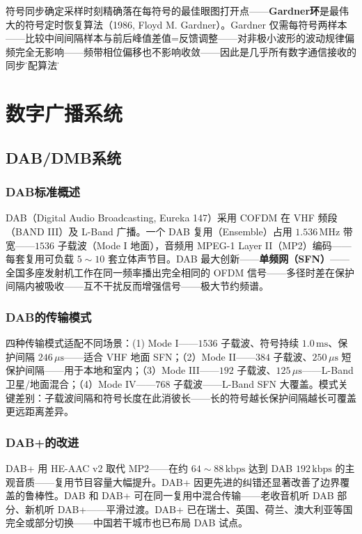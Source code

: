 \documentclass[12pt,UTF8]{ctexbook}
\begin{document}
符号同步确定采样时刻精确落在每符号的最佳眼图打开点——\textbf{Gardner环}是最伟大的符号定时恢复算法（1986, Floyd M. Gardner）。Gardner 仅需每符号两样本——比较中间间隔样本与前后峰值差值=反馈调整——对非极小波形的波动规律偏频完全无影响——频带相位偏移也不影响收敛——因此是几乎所有数字通信接收的同步\"标配算法\"。


\chapter{数字广播系统}
\label{chap:digital_broadcast_systems}

\section{DAB/DMB系统}
\label{sec:dab_system}

\subsection{DAB标准概述}

DAB（Digital Audio Broadcasting, Eureka 147）采用 COFDM 在 VHF 频段（BAND III）及 L-Band 广播。一个 DAB 复用（Ensemble）占用 $1.536\,\mathrm{MHz}$ 带宽——$1536$ 子载波（Mode I 地面），音频用 MPEG-1 Layer II（MP2）编码——每套复用可负载 $5\sim10$ 套立体声节目。DAB 最大创新——\textbf{单频网（SFN）}——全国多座发射机工作在同一频率播出完全相同的 OFDM 信号——多径时差在保护间隔内被吸收——互不干扰反而增强信号——极大节约频谱。

\subsection{DAB的传输模式}

四种传输模式适配不同场景：(1) Mode I——$1536$ 子载波、符号持续 $1.0\,\mathrm{ms}$、保护间隔 $246\,\mu\mathrm{s}$——适合 VHF 地面 SFN；（2）Mode II——$384$ 子载波、$250\,\mu\mathrm{s}$ 短保护间隔——用于本地和室内；（3）Mode III——$192$ 子载波、$125\,\mu\mathrm{s}$——L-Band 卫星/地面混合；（4）Mode IV——$768$ 子载波——L-Band SFN 大覆盖。模式关键差别：子载波间隔和符号长度在此消彼长——长的符号越长保护间隔越长可覆盖更远距离差异。

\subsection{DAB+的改进}

DAB+ 用 HE-AAC v2 取代 MP2——在约 $64\sim88\,\mathrm{kbps}$ 达到 DAB $192\,\mathrm{kbps}$ 的主观音质——复用节目容量大幅提升。DAB+ 因更先进的纠错还显著改善了边界覆盖的鲁棒性。DAB 和 DAB+ 可在同一复用中混合传输——老收音机听 DAB 部分、新机听 DAB+——平滑过渡。DAB+ 已在瑞士、英国、荷兰、澳大利亚等国完全或部分切换——中国若干城市也已布局 DAB 试点。
\end{document}
